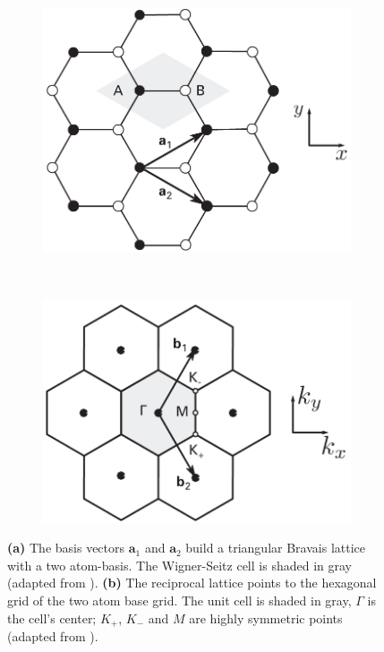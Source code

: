 \begin{figure}[!h]
  \centering
  \begin{subfigure}{0.45\textwidth}
    \includegraphics[width=\textwidth]{./images/cell.png}
  \end{subfigure}
  ~
  \begin{subfigure}{0.45\textwidth}
    \includegraphics[width=\textwidth]{./images/k-cell.png}
  \end{subfigure}
  \caption{\textbf{(a)} The basis vectors $\mathbf{a}_1$ and $\mathbf{a}_2$ build a triangular Bravais lattice with a two atom-basis. The Wigner-Seitz cell is shaded in gray (adapted from \mcite). \textbf{(b)} The reciprocal lattice points to the hexagonal grid of the two atom base grid. The unit cell is shaded in gray, $\Gamma$ is the cell's center; $K_+$, $K_-$ and $M$ are highly symmetric points (adapted from \mcite). }
  \label{fig:lattice}
\end{figure}

